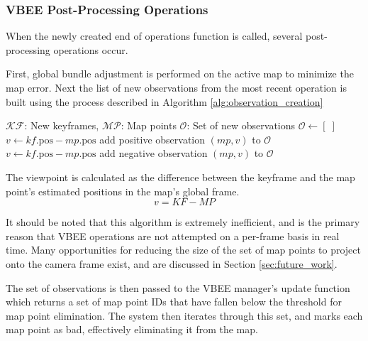 \subsubsection{VBEE Post-Processing Operations}

When the newly created end of operations function is called, several post-processing operations occur.

First, global bundle adjustment is performed on the active map to minimize the map error.
Next the list of new observations from the most recent operation is built using the process described in Algorithm \ref{alg:observation_creation}
\begin{singlespace}
    \begin{algorithm}[H]
        \caption{New Observation Creation}
        \label{alg:observation_creation}
        \begin{algorithmic}
            \Require $\mathcal{KF}$: New keyframes, $\mathcal{MP}$: Map points
            \Ensure $\mathcal{O}$: Set of new observations
            \State $\mathcal{O} \gets [\;]$
                        \State $v \gets kf.\text{pos} - mp.\text{pos}$
                        \State add positive observation $(mp, v)$ to $\mathcal{O}$
                        \State $v \gets kf.\text{pos} - mp.\text{pos}$
                        \State add negative observation $(mp, v)$ to $\mathcal{O}$
                    \EndIf
                \EndFor
            \EndFor
        \end{algorithmic}
    \end{algorithm}
\end{singlespace}

The viewpoint is calculated as the difference between the keyframe and the map point's estimated positions in the map's global frame.
$$ v = KF - MP $$

It should be noted that this algorithm is extremely inefficient, and is the primary reason that VBEE operations are not attempted on a per-frame basis in real time. Many opportunities for reducing the size of the set of map points to project onto the camera frame exist, and are discussed in Section \ref{sec:future_work}.

The set of observations is then passed to the VBEE manager's update function which returns a set of map point IDs that have fallen below the threshold for map point elimination. The system then iterates through this set, and marks each map point as bad, effectively eliminating it from the map.

